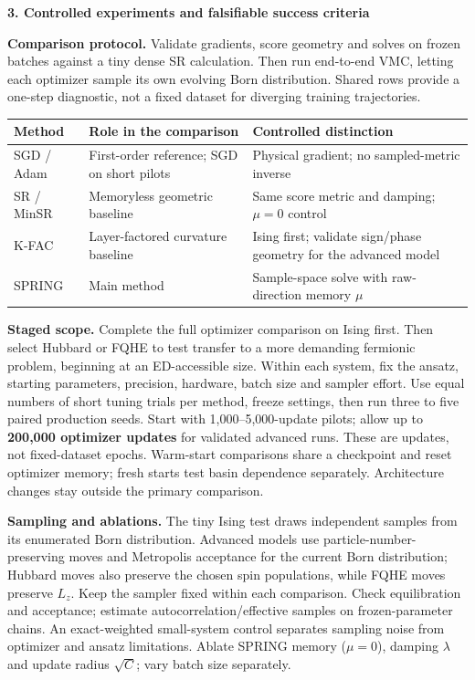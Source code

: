 \documentclass[10pt,letterpaper]{article}
\newcommand{\topic}[1]{\vspace{4pt}\textbf{\color{ink}#1}\par}
\begin{document}
\newpage
\topic{3. Controlled experiments and falsifiable success criteria}
\textbf{Comparison protocol.} Validate gradients, score geometry and solves on frozen batches against a tiny dense SR calculation. Then run end-to-end VMC, letting each optimizer sample its own evolving Born distribution. Shared rows provide a one-step diagnostic, not a fixed dataset for diverging training trajectories.

\begin{center}\small
\begin{tabular}{@{}p{1.05in}p{2.63in}p{2.95in}@{}}\toprule
Method & Role in the comparison & Controlled distinction\\\midrule
SGD / Adam & First-order reference; SGD on short pilots & Physical gradient; no sampled-metric inverse\\
SR / MinSR & Memoryless geometric baseline & Same score metric and damping; $\mu=0$ control\\
K-FAC & Layer-factored curvature baseline & Ising first; validate sign/phase geometry for the advanced model\\
SPRING & Main method & Sample-space solve with raw-direction memory $\mu$\\\bottomrule
\end{tabular}\end{center}

\textbf{Staged scope.} Complete the full optimizer comparison on Ising first. Then select Hubbard or FQHE to test transfer to a more demanding fermionic problem, beginning at an ED-accessible size. Within each system, fix the ansatz, starting parameters, precision, hardware, batch size and sampler effort. Use equal numbers of short tuning trials per method, freeze settings, then run three to five paired production seeds. Start with 1,000--5,000-update pilots; allow up to \textbf{200,000 optimizer updates} for validated advanced runs. These are updates, not fixed-dataset epochs. Warm-start comparisons share a checkpoint and reset optimizer memory; fresh starts test basin dependence separately. Architecture changes stay outside the primary comparison.

\textbf{Sampling and ablations.} The tiny Ising test draws independent samples from its enumerated Born distribution. Advanced models use particle-number-preserving moves and Metropolis acceptance for the current Born distribution; Hubbard moves also preserve the chosen spin populations, while FQHE moves preserve $L_z$. Keep the sampler fixed within each comparison. Check equilibration and acceptance; estimate autocorrelation/effective samples on frozen-parameter chains. An exact-weighted small-system control separates sampling noise from optimizer and ansatz limitations. Ablate SPRING memory ($\mu=0$), damping $\lambda$ and update radius $\sqrt C$; vary batch size separately.
\end{document}
